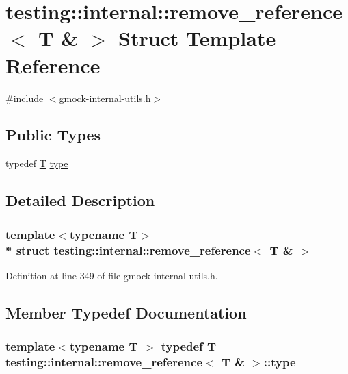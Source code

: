 \hypertarget{structtesting_1_1internal_1_1remove__reference_3_01_t_01_6_01_4}{}\section{testing\+:\+:internal\+:\+:remove\+\_\+reference$<$ T \& $>$ Struct Template Reference}
\label{structtesting_1_1internal_1_1remove__reference_3_01_t_01_6_01_4}


{\ttfamily \#include $<$gmock-\/internal-\/utils.\+h$>$}

\subsection*{Public Types}
\begin{DoxyCompactItemize}
\item 
typedef \hyperlink{functions__7_8js_adf1f3edb9115acb0a1e04209b7a9937b}{T} \hyperlink{structtesting_1_1internal_1_1remove__reference_3_01_t_01_6_01_4_a0d72f004f54016a47c752a82be352a19}{type}
\end{DoxyCompactItemize}


\subsection{Detailed Description}
\subsubsection*{template$<$typename T$>$\\*
struct testing\+::internal\+::remove\+\_\+reference$<$ T \& $>$}



Definition at line 349 of file gmock-\/internal-\/utils.\+h.



\subsection{Member Typedef Documentation}
\subsubsection[{\texorpdfstring{type}{type}}]{\setlength{\rightskip}{0pt plus 5cm}template$<$typename T $>$ typedef {\bf T} {\bf testing\+::internal\+::remove\+\_\+reference}$<$ {\bf T} \& $>$\+::{\bf type}}\hypertarget{structtesting_1_1internal_1_1remove__reference_3_01_t_01_6_01_4_a0d72f004f54016a47c752a82be352a19}{}\label{structtesting_1_1internal_1_1remove__reference_3_01_t_01_6_01_4_a0d72f004f54016a47c752a82be352a19}


